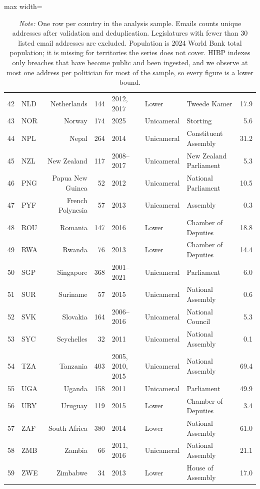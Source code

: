\begin{table}[!htbp]
\begin{adjustbox}{max width=\linewidth}
\begin{tabular}{llrrlllr}
42 & NLD & Netherlands & 144 & 2012, 2017 & Lower & Tweede Kamer & 17.9 \\
43 & NOR & Norway & 174 & 2025 & Unicameral & Storting & 5.6 \\
44 & NPL & Nepal & 264 & 2014 & Unicameral & Constituent Assembly & 31.2 \\
45 & NZL & New Zealand & 117 & 2008--2017 & Unicameral & New Zealand Parliament & 5.3 \\
46 & PNG & Papua New Guinea & 52 & 2012 & Unicameral & National Parliament & 10.5 \\
47 & PYF & French Polynesia & 57 & 2013 & Unicameral & Assembly & 0.3 \\
48 & ROU & Romania & 147 & 2016 & Lower & Chamber of Deputies & 18.8 \\
49 & RWA & Rwanda & 76 & 2013 & Lower & Chamber of Deputies & 14.4 \\
50 & SGP & Singapore & 368 & 2001--2021 & Unicameral & Parliament & 6.0 \\
51 & SUR & Suriname & 57 & 2015 & Unicameral & National Assembly & 0.6 \\
52 & SVK & Slovakia & 164 & 2006--2016 & Unicameral & National Council & 5.3 \\
53 & SYC & Seychelles & 32 & 2011 & Unicameral & National Assembly & 0.1 \\
54 & TZA & Tanzania & 403 & 2005, 2010, 2015 & Unicameral & National Assembly & 69.4 \\
55 & UGA & Uganda & 158 & 2011 & Unicameral & Parliament & 49.9 \\
56 & URY & Uruguay & 119 & 2015 & Lower & Chamber of Deputies & 3.4 \\
57 & ZAF & South Africa & 380 & 2014 & Lower & National Assembly & 61.0 \\
58 & ZMB & Zambia & 66 & 2011, 2016 & Unicameral & National Assembly & 21.1 \\
59 & ZWE & Zimbabwe & 34 & 2013 & Lower & House of Assembly & 17.0 \\
\bottomrule
\end{tabular}
\end{adjustbox}
\caption*{\scriptsize \emph{Note:} One row per country in the analysis sample. Emails counts unique addresses after validation and deduplication. Legislatures with fewer than 30 listed email addresses are excluded. Population is 2024 World Bank total population; it is missing for territories the series does not cover. HIBP indexes only breaches that have become public and been ingested, and we observe at most one address per politician for most of the sample, so every figure is a lower bound.}
\end{table}
